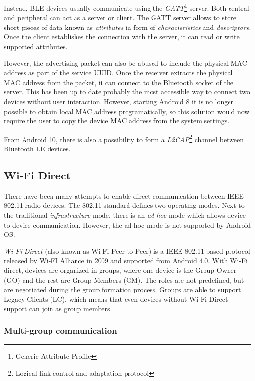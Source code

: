 \documentclass[conference,compsoc]{IEEEtran}
\begin{document}
Instead, BLE devices usually communicate using the \textit{GATT}\footnote{Generic Attribute Profile} server. Both central and peripheral can act as a server or client. The GATT server allows to store short pieces of data known as \textit{attributes} in form of \textit{characteristics} and \textit{descriptors}. Once the client establishes the connection with the server, it can read or write supported attributes.

However, the advertising packet can also be abused to include the physical MAC address as part of the service UUID. Once the receiver extracts the physical MAC address from the packet, it can connect to the Bluetooth socket of the server. This has been up to date probably the most accessible way to connect two devices without user interaction. However, starting Android 8 it is no longer possible to obtain local MAC address programatically, so this solution would now require the user to copy the device MAC address from the system settings.

From Android 10, there is also a possibility to form a \textit{L2CAP}\footnote{Logical link control and adaptation protocol} channel between Bluetooth LE devices.

\subsection{Wi-Fi Direct}

There have been many attempts to enable direct communication between IEEE 802.11 radio devices. The 802.11 standard defines two operating modes. Next to the traditional \textit{infrastructure} mode, there is an \textit{ad-hoc} mode which allows device-to-device communication. However, the ad-hoc mode is not supported by Android OS.

\textit{Wi-Fi Direct} (also known as Wi-Fi Peer-to-Peer) \cite{wifip2p} is a IEEE 802.11 based protocol released by Wi-FI Alliance in 2009 and supported from Android 4.0. With Wi-Fi direct, devices are organized in groups, where one device is the Group Owner (GO) and the rest are Group Members (GM). The roles are not predefined, but are negotiated during the group formation process. Groups are able to support Legacy Clients (LC), which means that even devices without Wi-Fi Direct support can join as group members.

\subsubsection{Multi-group communication}
\end{document}

